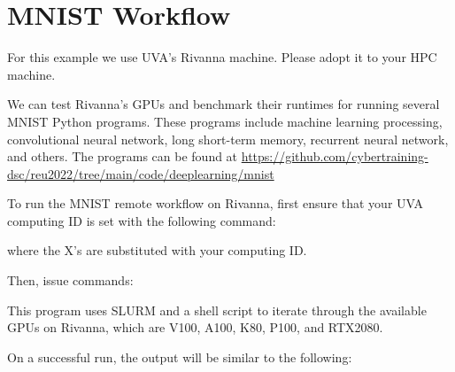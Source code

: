\hypertarget{mnist-workflow}{%
\section{MNIST Workflow}\label{mnist-workflow}}

For this example we use UVA's Rivanna machine. Please adopt it to your
HPC machine.

We can test Rivanna's GPUs and benchmark their runtimes for running
several MNIST Python programs. These programs include machine learning
processing, convolutional neural network, long short-term memory,
recurrent neural network, and others. The programs can be found at
\url{https://github.com/cybertraining-dsc/reu2022/tree/main/code/deeplearning/mnist}

To run the MNIST remote workflow on Rivanna, first ensure that your UVA
computing ID is set with the following command:

\begin{Shaded}
\begin{Highlighting}[]
\end{Highlighting}
\end{Shaded}

where the X's are substituted with your computing ID.

Then, issue commands:

\begin{Shaded}
\begin{Highlighting}[]
   \OperatorTok{=}
\end{Highlighting}
\end{Shaded}

This program uses SLURM and a shell script to iterate through the
available GPUs on Rivanna, which are V100, A100, K80, P100, and RTX2080.

On a successful run, the output will be similar to the following:

